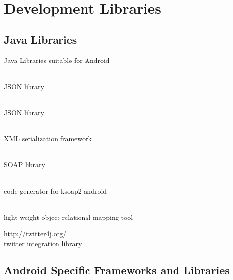 \documentclass[aspectratio=169]{beamer}
\newcommand{\surl}[1] {{\tiny \url{#1}}}
\begin{document}
\section{Development Libraries}

  \subsection{Java Libraries}

    \begin{frame}{Java Libraries suitable for Android}
      \begin{description}
        \item<1->[Jackson \surl{http://jackson.codehaus.org/}] \hfill \\ JSON library 
        \item<2->[google-gson \surl{http://code.google.com/p/google-gson/}] \hfill \\ JSON library
        \item<3->[SimpleXML \surl{http://simple.sourceforge.net/home.php}] \hfill \\ XML serialization framework 
        \item<4->[ksoap2-android  \surl{http://code.google.com/p/ksoap2-android/}] \hfill \\ SOAP library 
        \item<5->[WSDL2Android \surl{https://github.com/kigero/WSDL2Android}] \hfill \\ code generator for ksoap2-android
        \item<6->[ormlite \surl{http://ormlite.com/}] \hfill \\ light-weight object relational mapping tool 
        \item<7->[Twitter4J] \surl{http://twitter4j.org/} \hfill \\ twitter integration library 
      \end{description}
    \end{frame}

  \subsection{Android Specific Frameworks and Libraries}
\end{document}
